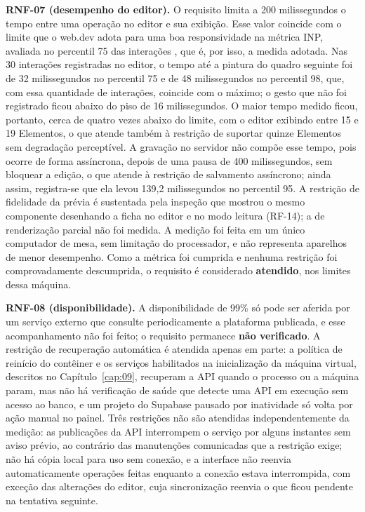 \textbf{RNF-07 (desempenho do editor).} O requisito limita a 200 milissegundos o tempo entre uma operação no editor e sua exibição. Esse valor coincide com o limite que o web.dev adota para uma boa responsividade na métrica INP, avaliada no percentil 75 das interações \cite{wagner2022inp}, que é, por isso, a medida adotada. Nas 30 interações registradas no editor, o tempo até a pintura do quadro seguinte foi de 32 milissegundos no percentil 75 e de 48 milissegundos no percentil 98, que, com essa quantidade de interações, coincide com o máximo; o gesto que não foi registrado ficou abaixo do piso de 16 milissegundos. O maior tempo medido ficou, portanto, cerca de quatro vezes abaixo do limite, com o editor exibindo entre 15 e 19 Elementos, o que atende também à restrição de suportar quinze Elementos sem degradação perceptível. A gravação no servidor não compõe esse tempo, pois ocorre de forma assíncrona, depois de uma pausa de 400 milissegundos, sem bloquear a edição, o que atende à restrição de salvamento assíncrono; ainda assim, registra-se que ela levou 139,2 milissegundos no percentil 95. A restrição de fidelidade da prévia é sustentada pela inspeção que mostrou o mesmo componente desenhando a ficha no editor e no modo leitura (RF-14); a de renderização parcial não foi medida. A medição foi feita em um único computador de mesa, sem limitação do processador, e não representa aparelhos de menor desempenho. Como a métrica foi cumprida e nenhuma restrição foi comprovadamente descumprida, o requisito é considerado \textbf{atendido}, nos limites dessa máquina.

\textbf{RNF-08 (disponibilidade).} A disponibilidade de 99\% só pode ser aferida por um serviço externo que consulte periodicamente a plataforma publicada, e esse acompanhamento não foi feito; o requisito permanece \textbf{não verificado}. A restrição de recuperação automática é atendida apenas em parte: a política de reinício do contêiner e os serviços habilitados na inicialização da máquina virtual, descritos no Capítulo~\ref{cap:09}, recuperam a API quando o processo ou a máquina param, mas não há verificação de saúde que detecte uma API em execução sem acesso ao banco, e um projeto do Supabase pausado por inatividade só volta por ação manual no painel. Três restrições não são atendidas independentemente da medição: as publicações da API interrompem o serviço por alguns instantes sem aviso prévio, ao contrário das manutenções comunicadas que a restrição exige; não há cópia local para uso sem conexão, e a interface não reenvia automaticamente operações feitas enquanto a conexão estava interrompida, com exceção das alterações do editor, cuja sincronização reenvia o que ficou pendente na tentativa seguinte.

